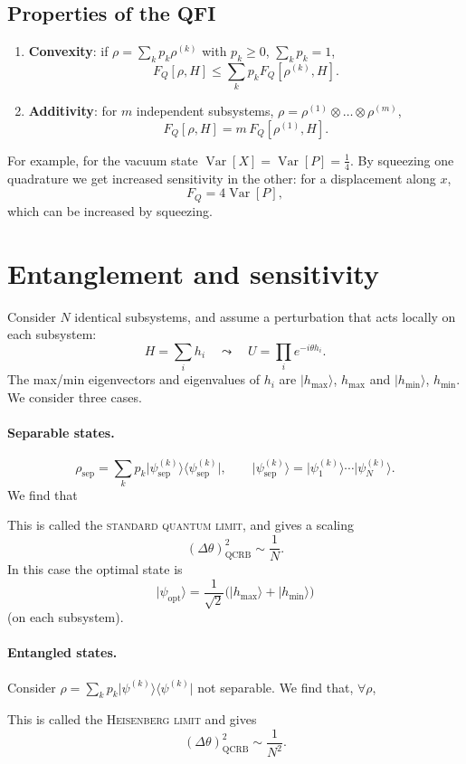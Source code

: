 \documentclass[11pt,a4paper]{article}
\newcommand{\boxedeq}[1]{%
  \par\vspace{0.4\baselineskip}%
  {\centering\keybox{$\displaystyle #1$}\par}%
  \vspace{0.4\baselineskip}}
\newcommand{\ket}[1]{\lvert #1\rangle}
\newcommand{\ketbra}[2]{\lvert #1\rangle\!\langle #2\rvert}
\newcommand{\FQ}{F_Q}
\newcommand{\term}[1]{\textsc{#1}}
\begin{document}
\subsection{Properties of the QFI}
\begin{enumerate}[label=(\roman*)]
  \item \textbf{Convexity}: if $\rho=\sum_k p_k\rho^{(k)}$ with $p_k\geq0$, $\sum_k p_k=1$,
        \[ \FQ[\rho,H] \leq \sum_k p_k\FQ[\rho^{(k)},H]. \]
  \item \textbf{Additivity}: for $m$ independent subsystems, $\rho=\rho^{(1)}\otimes\dots\otimes\rho^{(m)}$,
        \[ \FQ[\rho,H] = m\,\FQ[\rho^{(1)},H]. \]
\end{enumerate}
For example, for the vacuum state $\operatorname{Var}[X]=\operatorname{Var}[P]=\frac14$. By squeezing one quadrature we get increased sensitivity in the other: for a displacement along $x$,
\[
  \FQ = 4\operatorname{Var}[P],
\]
which can be increased by squeezing.

\section{Entanglement and sensitivity}

Consider $N$ identical subsystems, and assume a perturbation that acts locally on each subsystem:
\[
  H = \sum_i h_i \quad\leadsto\quad U = \prod_i e^{-i\theta h_i}.
\]
The max/min eigenvectors and eigenvalues of $h_i$ are $\ket{h_{\max}}$, $h_{\max}$ and $\ket{h_{\min}}$, $h_{\min}$. We consider three cases.

\paragraph{Separable states.}
\[
  \rho_{\text{sep}} = \sum_k p_k\ketbra{\psi^{(k)}_{\text{sep}}}{\psi^{(k)}_{\text{sep}}},\qquad
  \ket{\psi^{(k)}_{\text{sep}}} = \ket{\psi^{(k)}_1}\cdots\ket{\psi^{(k)}_N}.
\]
We find that
\boxedeq{\FQ[\rho_{\text{sep}},H] \leq N\,(h_{\max}-h_{\min})^2}
This is called the \term{standard quantum limit}, and gives a scaling
\[
  (\Delta\theta)^2_{\text{QCRB}} \sim \frac1N .
\]
In this case the optimal state is
\[
  \ket{\psi_{\text{opt}}} = \frac{1}{\sqrt2}\bigl(\ket{h_{\max}}+\ket{h_{\min}}\bigr)
\]
(on each subsystem).

\paragraph{Entangled states.} Consider $\rho=\sum_k p_k\ketbra{\psi^{(k)}}{\psi^{(k)}}$ not separable. We find that, $\forall\rho$,
\boxedeq{\FQ[\rho,H] \leq N^2\,(h_{\max}-h_{\min})^2}
This is called the \term{Heisenberg limit} and gives
\[
  (\Delta\theta)^2_{\text{QCRB}} \sim \frac{1}{N^2}.
\]
\end{document}
